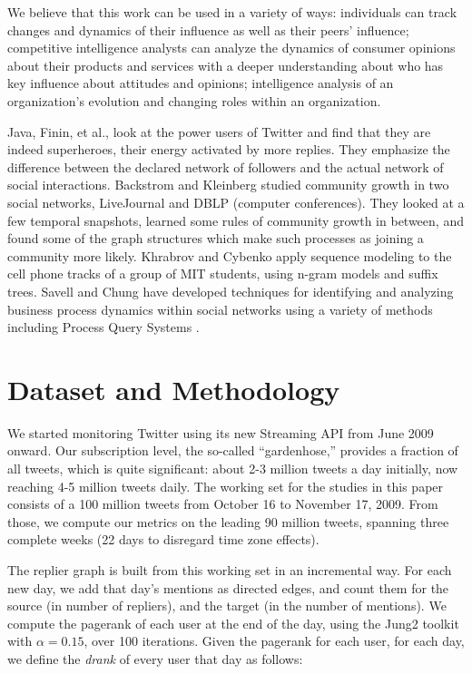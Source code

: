\documentclass[10pt,oneside]{memoir}
\begin{document}
\begin{Spacing}{2}
We believe that this work can be used in a variety of ways:  individuals can track changes and dynamics of their influence as well as their peers' influence; competitive intelligence analysts can analyze the dynamics of consumer opinions about their products and services with a deeper understanding about who has key influence about attitudes and opinions; intelligence analysis of an organization's evolution and changing roles within an organization.


Java, Finin, et al., \cite{DBLP:conf/kdd/JavaSFT07} look at the power users of Twitter and find that they are indeed superheroes, their energy activated by more replies.  They emphasize the difference between the declared network of followers and the actual network of social interactions. Backstrom and Kleinberg \cite{DBLP:conf/kdd/BackstromHKL06} studied community growth in two social networks, LiveJournal and DBLP (computer conferences).  They looked at a few temporal snapshots, learned some rules of community growth in between, and found some of the graph structures which make such processes as joining a community more likely.  Khrabrov and Cybenko \cite{DBLP:conf/cse/KhrabrovC09} apply sequence modeling to the cell phone tracks of a group of MIT students, using n-gram models and suffix trees.  Savell \cite{Savell:2008:Intelligence} and Chung \cite{Chung:2006:Tracking} have developed techniques for identifying and analyzing business process dynamics within social networks using a variety of methods including Process Query Systems \cite{PQS:2007}.


\pagebreak \section{Dataset and Methodology}
\label{datasetandmethodology}

We started monitoring Twitter using its new Streaming API from June 2009 onward.  Our subscription level, the so-called ``gardenhose,'' provides a fraction of all tweets, which is quite significant: about 2-3 million tweets a day initially, now reaching 4-5 million tweets daily.  The working set for the studies in this paper consists of a 100 million tweets from October 16 to November 17, 2009.   From those, we compute our metrics on the leading 90 million tweets, spanning three complete weeks (22 days to disregard time zone effects).


The replier graph is built from this working set in an incremental way.  For each new day, we add that day's mentions as directed edges, and count them for the source (in number of repliers), and the target (in the number of mentions).  We compute the pagerank \cite{DBLP:journals/cn/BrinP98} of each user at the end of the day, using the Jung2 toolkit \cite{code:jung} with $\alpha=0.15$, over 100 iterations. Given the pagerank for each user, for each day, we define the {\itshape drank} of every user that day as follows:



\end{Spacing}
\end{document}
